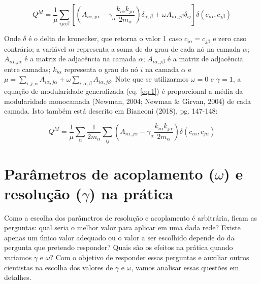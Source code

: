 \documentclass[
  12pt,
]{article}
\begin{document}
\begin{equation} \label{eq:1}
Q^{M} = \frac{1}{\mu} \sum_{ij\alpha\beta} \left[ \left(A_{i\alpha,j\alpha} - \gamma_{\alpha} \frac{k_{i\alpha} k_{j\alpha}}{2m_\alpha} \right) \delta_{\alpha,\beta} + \omega A_{i\alpha,j\beta} \delta_{ij} \right] \delta(c_{i\alpha}, c_{j \beta})
\end{equation}

Onde \(\delta\) é o delta de kronecker, que retorna o valor 1 caso
\(c_{i\alpha} = c_{j \beta}\) e zero caso contrário; a variável \(m\)
representa a soma de do grau de cada nó na camada \(\alpha\);
\(A_{i\alpha,j\alpha}\) é a matriz de adjacência na camada \(\alpha\);
\(A_{i\alpha,j\beta}\) é a matriz de adjacência entre camadas;
\(k_{i\alpha}\) representa o grau do nó \(i\) na camada \(\alpha\) e
\(\mu = \sum_{i,j, \alpha}A_{i\alpha,j\alpha} + \omega \sum_{i,\alpha,\beta} A_{i\alpha,j\beta}\).
Note que se utilizarmos \(\omega = 0\) e \(\gamma = 1\), a equação de
modularidade generalizada (eq. \ref{eq:1}) é proporcional a média da
modularidade monocamada (Newman, 2004; Newman \& Girvan, 2004) de cada
camada. Isto também está descrito em Bianconi (2018), pg. 147-148:

\begin{equation} \label{eq:2}
Q^{M} = \frac{1}{\mu} \sum_{\alpha} \frac{1}{2m_\alpha} \sum_{ij} \left(A_{i\alpha,j\alpha} - \gamma_{\alpha} \frac{k_{i\alpha} k_{j\alpha}}{2m_\alpha} \right) \delta(c_{i\alpha}, c_{j\alpha}) \end{equation}

\hypertarget{paruxe2metros-de-acoplamento-omega-e-resoluuxe7uxe3o-gamma-na-pruxe1tica}{%
\section{\texorpdfstring{Parâmetros de acoplamento (\(\omega\)) e
resolução (\(\gamma\)) na
prática}{Parâmetros de acoplamento (\textbackslash omega) e resolução (\textbackslash gamma) na prática}}\label{paruxe2metros-de-acoplamento-omega-e-resoluuxe7uxe3o-gamma-na-pruxe1tica}}

Como a escolha dos parâmetros de resolução e acoplamento é arbitrária,
ficam as perguntas: qual seria o melhor valor para aplicar em uma dada
rede? Existe apenas um único valor adequado ou o valor a ser escolhido
depende do da pergunta que pretendo responder? Quais são os efeitos na
prática quando variamos \(\gamma\) e \(\omega\)? Com o objetivo de
responder essas perguntas e auxiliar outros cientistas na escolha dos
valores de \(\gamma\) e \(\omega\), vamos analisar essas questões em
detalhes.
\end{document}
